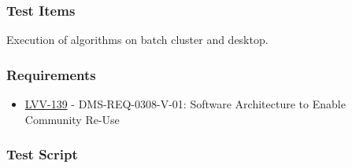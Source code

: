 \hypertarget{test-items-100}{%
\subsubsection{Test Items}\label{test-items-100}}

Execution of algorithms on batch cluster and desktop.

\hypertarget{requirements-101}{%
\subsubsection{Requirements}\label{requirements-101}}

\begin{itemize}
\tightlist
\item
  \href{https://jira.lsstcorp.org/browse/LVV-139}{LVV-139} -
  DMS-REQ-0308-V-01: Software Architecture to Enable Community Re-Use
\end{itemize}

\hypertarget{test-script-101}{%
\subsubsection{Test Script}\label{test-script-101}}

